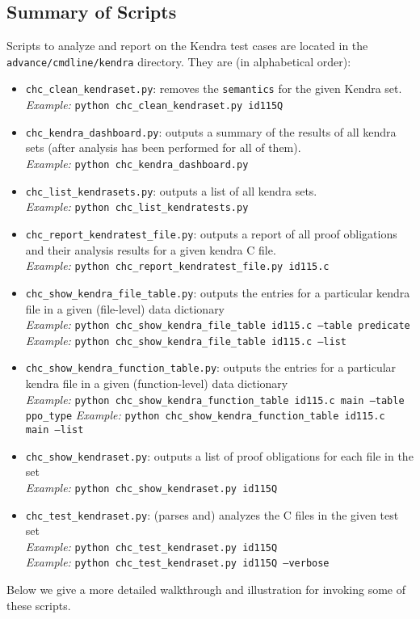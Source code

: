 \documentclass[11pt]{article}
\begin{document}
\subsection{Summary of Scripts}
Scripts to analyze and report on the Kendra test cases are located in the 
{\tt advance/cmdline/kendra} directory. They are (in alphabetical
order):
\begin{itemize}[leftmargin=*]
\item {\tt chc\_clean\_kendraset.py}: removes the {\tt semantics} for the given
  Kendra set. \\
  \emph{Example:} {\tt python chc\_clean\_kendraset.py id115Q}
\item {\tt chc\_kendra\_dashboard.py}: outputs a summary of the results of all
  kendra sets (after analysis has been performed for all of them). \\
  \emph{Example:} {\tt python chc\_kendra\_dashboard.py}
\item {\tt chc\_list\_kendrasets.py}: outputs a list of all kendra sets.\\
  \emph{Example:} {\tt python chc\_list\_kendratests.py}
\item {\tt chc\_report\_kendratest\_file.py}: outputs a report of all proof obligations
   and their analysis results for a given kendra C file. \\
   \emph{Example:} {\tt python chc\_report\_kendratest\_file.py id115.c}
\item {\tt chc\_show\_kendra\_file\_table.py}: outputs the entries for a particular
   kendra file in a given (file-level) data dictionary \\
   \emph{Example:} {\tt python chc\_show\_kendra\_file\_table id115.c --table predicate} \\
   \emph{Example:} {\tt python chc\_show\_kendra\_file\_table id115.c --list}
\item {\tt chc\_show\_kendra\_function\_table.py}: outputs the entries for a particular
   kendra file in a given (function-level) data dictionary \\
   \emph{Example:} {\tt python chc\_show\_kendra\_function\_table id115.c main --table 
     ppo\_type}
   \emph{Example:} {\tt python chc\_show\_kendra\_function\_table id115.c main --list}
\item {\tt chc\_show\_kendraset.py}: outputs a list of proof obligations for each file
    in the set \\
    \emph{Example:} {\tt python chc\_show\_kendraset.py id115Q}
\item {\tt chc\_test\_kendraset.py}: (parses and) analyzes the C files in the given test
    set \\
    \emph{Example:} {\tt python chc\_test\_kendraset.py id115Q} \\
    \emph{Example:} {\tt python chc\_test\_kendraset.py id115Q --verbose}
\end{itemize}
Below we give a more detailed walkthrough and illustration for invoking some of these scripts.
\end{document}

